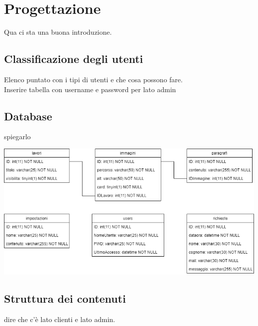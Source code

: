 \section{Progettazione}
Qua ci sta una buona introduzione.

\subsection{Classificazione degli utenti}
Elenco puntato con i tipi di utenti e che cosa possono fare.
\\ Inserire tabella con username e password per lato admin

\subsection{Database}
spiegarlo \\
\begin{center}
\includegraphics[scale = 0.5]{../latex/images/db.png}\\[1.5cm]
\end{center}

\subsection{Struttura dei contenuti}
dire che c'è lato clienti e lato admin.

